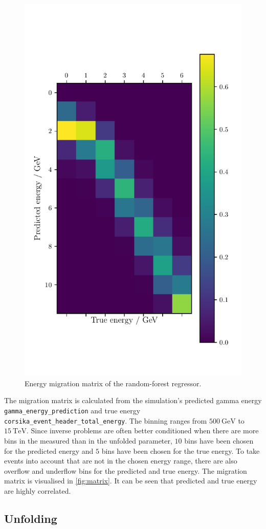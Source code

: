 \begin{figure}[tb]
  \centering
  \includegraphics[width=.7\textwidth]{plots/Matrix.pdf}
  \caption{Energy migration matrix of the random-forest regressor.}
  \label{fig:matrix}
\end{figure}

The migration matrix is calculated from the simulation's predicted gamma energy \texttt{gamma\_energy\_prediction} and true energy \texttt{corsika\_event\_header\_total\_energy}. The binning ranges from $\SI{500}{\giga\eV}$ to $\SI{15}{\tera\eV}$. Since inverse problems are often better conditioned when there are more bins in the measured than in the unfolded parameter, $\num{10}$ bins have been chosen for the predicted energy and $\num{5}$ bins have been chosen for the true energy. To take events into account that are not in the chosen energy range, there are also overflow and underflow bins for the predicted and true energy. The migration matrix is visualised in \autoref{fig:matrix}. It can be seen that predicted and true energy are highly correlated.

\subsection{Unfolding}

